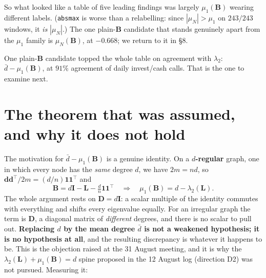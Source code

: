 \documentclass[11pt,a4paper]{article}
\newcommand{\Lap}{\mathbf{L}}
\newcommand{\Bmat}{\mathbf{B}}
\newcommand{\Dmat}{\mathbf{D}}
\newcommand{\dvec}{\mathbf{d}}
\begin{document}
So what looked like a table of five leading findings was largely $\mu_1(\Bmat)$
wearing different labels. (\texttt{absmax} is worse than a relabelling: since
$|\mu_N| > \mu_1$ on $243/243$ windows, it \emph{is} $|\mu_N|$.) The one plain-$\Bmat$
candidate that stands genuinely apart from the $\mu_1$ family is $\mu_N(\Bmat)$,
at $-0.668$; we return to it in \S8.

One plain-$\Bmat$ candidate topped the whole table on agreement with $\lambda_2$:
$\bar{d}-\mu_1(\Bmat)$, at $91\%$ agreement of daily invest/cash calls. That is
the one to examine next.

\section{The theorem that was assumed, and why it does not hold}

The motivation for $\bar{d}-\mu_1(\Bmat)$ is a genuine identity. On a
\textbf{$d$-regular} graph, one in which every node has the \emph{same} degree $d$, we have
$2m = nd$, so $\dvec\dvec^{\!\top}\!/2m = (d/n)\mathbf{1}\mathbf{1}^{\!\top}$ and
\[
\Bmat = d\mathbf{I} - \Lap - \tfrac{d}{n}\mathbf{1}\mathbf{1}^{\!\top}
\quad\Longrightarrow\quad
\mu_1(\Bmat) = d - \lambda_2(\Lap).
\]
The whole argument rests on $\Dmat = d\mathbf{I}$: a scalar multiple of the
identity commutes with everything and shifts every eigenvalue equally. For an
irregular graph the term is $\Dmat$, a diagonal matrix of \emph{different}
degrees, and there is no scalar to pull out. \textbf{Replacing $d$ by the mean
degree $\bar{d}$ is not a weakened hypothesis; it is no hypothesis at all}, and
the resulting discrepancy is whatever it happens to be. This is the objection
raised at the 31 August meeting, and it is why the $\lambda_2(\Lap)+\mu_1(\Bmat)=d$
spine proposed in the 12 August log (direction D2) was not pursued. Measuring it:
\end{document}
